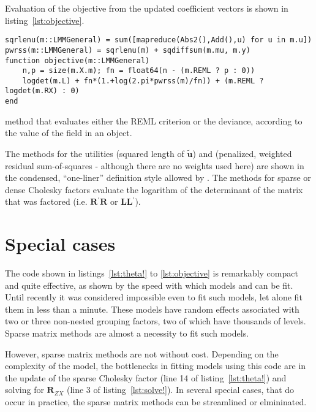 \documentclass{jss}
\newcommand{\trans}{\ensuremath{^\prime}}
\begin{document}
Evaluation of the objective from the updated coefficient vectors is
shown in listing~\ref{lst:objective}.
\begin{listing}[tbp]
  \begin{verbatim}
sqrlenu(m::LMMGeneral) = sum([mapreduce(Abs2(),Add(),u) for u in m.u])
pwrss(m::LMMGeneral) = sqrlenu(m) + sqdiffsum(m.mu, m.y)
function objective(m::LMMGeneral)
    n,p = size(m.X.m); fn = float64(n - (m.REML ? p : 0))
    logdet(m.L) + fn*(1.+log(2.pi*pwrss(m)/fn)) + (m.REML ? logdet(m.RX) : 0)
end
  \end{verbatim}
  \caption{ method that evaluates either the REML
    criterion or the deviance, according to the value of the
     field in an  object.}
  \label{lst:objective}
\end{listing}
The methods for the utilities  (squared length of
$\tilde{\bm u}$) and  (penalized, weighted residual
sum-of-squares - although there are no weights used here) are shown in
the condensed, ``one-liner'' definition style allowed by
.  The  methods for sparse or dense
Cholesky factors evaluate the logarithm of the determinant of the
matrix that was factored (i.e. $\bm R\trans\bm R$ or $\bm L\bm
L\trans$).

\section{Special cases}
\label{sec:special}

The code shown in listings~\ref{lst:theta!} to \ref{lst:objective} is
remarkably compact and quite effective, as shown by the speed with
which models  and  can be fit.  Until recently it
was considered impossible even to fit such models, let alone fit them
in less than a minute.  These models have random effects associated
with two or three non-nested grouping factors, two of which have
thousands of levels.  Sparse matrix methods are almost a necessity to
fit such models.

However, sparse matrix methods are not without cost.  Depending on the
complexity of the model, the bottlenecks in fitting models using this
code are in the update of the sparse Cholesky factor (line 14 of
listing~\ref{lst:theta!}) and solving for $\bm R_{ZX}$ (line 3 of
listing~\ref{lst:solve!}).  In several special cases, that do occur in
practice, the sparse matrix methods can be streamlined or elmininated.
\end{document}
